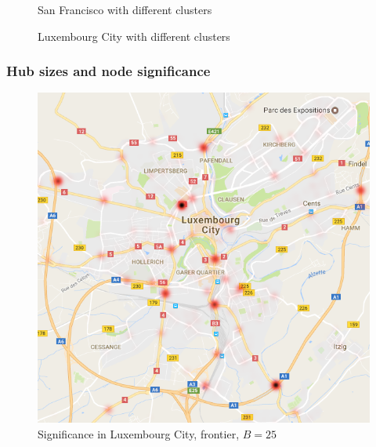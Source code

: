 \begin{figure}
\hfill

\caption{San Francisco with different clusters}\label{fig:clusters_sf}
\end{figure}

\begin{figure}
\hfill

\caption{Luxembourg City with different clusters}\label{fig:clusters_lu}
\end{figure}


\subsubsection{Hub sizes and node significance}

\begin{figure}
\begin{center}
\includegraphics[scale=0.37]{TexImg/map_LU_sig.png}
\end{center}
\caption{Significance in Luxembourg City, frontier, $B=25$}\label{fig:map_LU} 
\end{figure}

